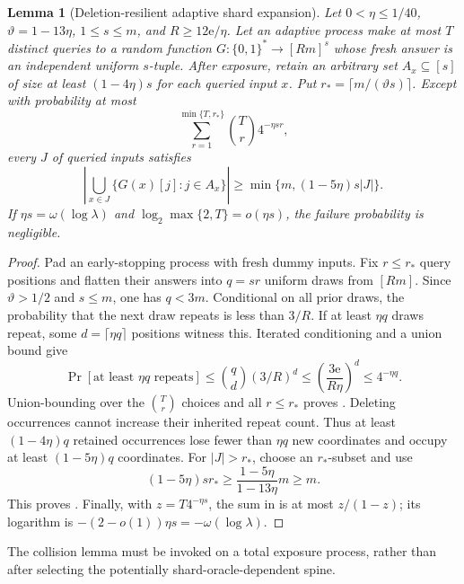 \documentclass[11pt]{article}
\newtheorem{lemma}{Lemma}[section]
\begin{document}
\begin{lemma}[Deletion-resilient adaptive shard expansion]
\label{lem:collision}
Let $0<\eta\le1/40$, $\vartheta=1-13\eta$, $1\le s\le m$, and
$R\ge12\mathrm e/\eta$.  Let an adaptive process make at most $T$ distinct
queries to a random function
$G:\{0,1\}^{*}\to[Rm]^s$ whose fresh answer is an independent uniform
$s$-tuple.  After exposure, retain an arbitrary set
$A_x\subseteq[s]$ of size at least $(1-4\eta)s$ for each queried input $x$.
Put $r_* =\lceil m/(\vartheta s)\rceil$.  Except with probability at most
\[
 \sum_{r=1}^{\min\{T,r_*\}}\binom Tr4^{-\eta sr},
\tag{20}\label{eq:collision-failure}
\]
every $J$ of queried inputs satisfies
\[
 \left|\bigcup_{x\in J}\{G(x)[j]:j\in A_x\}\right|
 \ge\min\{m,(1-5\eta)s|J|\}.
\tag{21}\label{eq:collision-expansion}
\]
If $\eta s=\omega(\log\lambda)$ and
$\log_2\max\{2,T\}=o(\eta s)$, the failure probability is negligible.
\end{lemma}

\begin{proof}
Pad an early-stopping process with fresh dummy inputs.  Fix $r\le r_*$ query
positions and flatten their answers into $q=sr$ uniform draws from $[Rm]$.
Since $\vartheta>1/2$ and $s\le m$, one has $q<3m$.  Conditional on all prior
draws, the probability that the next draw repeats is less than $3/R$.  If at
least $\eta q$ draws repeat, some $d=\lceil\eta q\rceil$ positions witness this.
Iterated conditioning and a union bound give
\[
 \Pr[\text{at least }\eta q\text{ repeats}]
 \le\binom qd(3/R)^d
 \le\left(\frac{3\mathrm e}{R\eta}\right)^d
 \le4^{-\eta q}.
\]
Union-bounding over the $\binom Tr$ choices and all $r\le r_*$ proves
.  Deleting occurrences cannot increase their
inherited repeat count.  Thus at least $(1-4\eta)q$ retained occurrences lose
fewer than $\eta q$ new coordinates and occupy at least
$(1-5\eta)q$ coordinates.  For $|J|>r_*$, choose an $r_*$-subset and use
\[
 (1-5\eta)sr_*\ge
 \frac{1-5\eta}{1-13\eta}m\ge m.
\]
This proves .  Finally, with
$z=T4^{-\eta s}$, the sum in  is at most
$z/(1-z)$; its logarithm is $-(2-o(1))\eta s=-\omega(\log\lambda)$.
\end{proof}

The collision lemma must be invoked on a total exposure process, rather than
after selecting the potentially shard-oracle-dependent spine.
\end{document}
